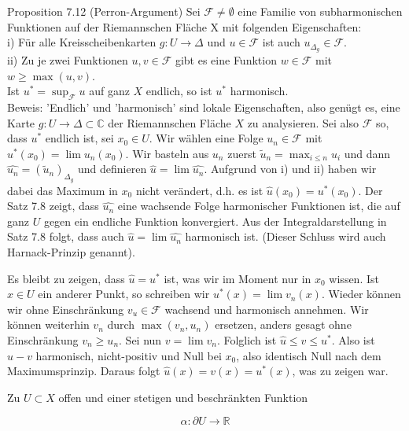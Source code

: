 \documentclass[10pt, letterpaper]{article}
\begin{document}
Proposition 7.12 (Perron-Argument) Sei $\mathcal{F} \neq \emptyset$ eine Familie von subharmonischen Funktionen auf der Riemannschen Fläche X mit folgenden Eigenschaften:\\
i) Für alle Kreisscheibenkarten $g: U \rightarrow \Delta$ und $u \in \mathcal{F}$ ist auch $u_{\Delta_{g}} \in \mathcal{F}$.\\
ii) Zu je zwei Funktionen $u, v \in \mathcal{F}$ gibt es eine Funktion $w \in \mathcal{F}$ mit $w \geq \max (u, v)$.\\
Ist $u^{*}=\sup _{\mathcal{F}} u$ auf ganz $X$ endlich, so ist $u^{*}$ harmonisch.\\
Beweis: 'Endlich' und 'harmonisch' sind lokale Eigenschaften, also genügt es, eine Karte $g: U \rightarrow \Delta \subset \mathbb{C}$ der Riemannschen Fläche $X$ zu analysieren. Sei also $\mathcal{F}$ so, dass $u^{*}$ endlich ist, sei $x_{0} \in U$. Wir wählen eine Folge $u_{n} \in \mathcal{F}$ mit $u^{*}\left(x_{0}\right)=\lim u_{n}\left(x_{0}\right)$. Wir basteln aus $u_{n}$ zuerst $\widetilde{u}_{n}=\max _{i \leq n} u_{i}$ und dann $\widehat{u_{n}}=\left(\widetilde{u}_{n}\right)_{\Delta_{g}}$ und definieren $\widehat{u}=\lim \widehat{u_{n}}$. Aufgrund von i) und ii) haben wir\\
dabei das Maximum in $x_{0}$ nicht verändert, d.h. es ist $\widehat{u}\left(x_{0}\right)=u^{*}\left(x_{0}\right)$. Der Satz 7.8 zeigt, dass $\widehat{u_{n}}$ eine wachsende Folge harmonischer Funktionen ist, die auf ganz $U$ gegen ein endliche Funktion konvergiert. Aus der Integraldarstellung in Satz 7.8 folgt, dass auch $\widehat{u}=\lim \widehat{u_{n}}$ harmonisch ist. (Dieser Schluss wird auch Harnack-Prinzip genannt).

Es bleibt zu zeigen, dass $\widehat{u}=u^{*}$ ist, was wir im Moment nur in $x_{0}$ wissen. Ist $x \in U$ ein anderer Punkt, so schreiben wir $u^{*}(x)=\lim v_{n}(x)$. Wieder können wir ohne Einschränkung $v_{u} \in \mathcal{F}$ wachsend und harmonisch annehmen. Wir können weiterhin $v_{n}$ durch $\max \left(v_{n}, u_{n}\right)$ ersetzen, anders gesagt ohne Einschränkung $v_{n} \geq u_{n}$. Sei nun $v=\lim v_{n}$. Folglich ist $\widehat{u} \leq v \leq u^{*}$. Also ist $\widehat{u}-v$ harmonisch, nicht-positiv und Null bei $x_{0}$, also identisch Null nach dem Maximumsprinzip. Daraus folgt $\widehat{u}(x)=v(x)=u^{*}(x)$, was zu zeigen war.

Zu $U \subset X$ offen und einer stetigen und beschränkten Funktion

$$
\alpha: \partial U \rightarrow \mathbb{R}
$$
\end{document}
